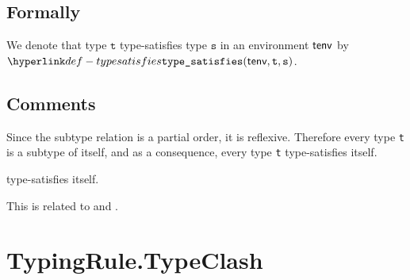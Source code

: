 \documentclass{book}
\newcommand\isanonymous[0]{\texttt{is\_anonymous}}
\newcommand\subtypesat[0]{\texttt{subtype\_satisfies}}
\newcommand\bitwidthequal[0]{\texttt{bitwidth\_equal}}
\newcommand\vt[0]{\texttt{t}}
\newcommand\vs[0]{\texttt{s}}
\begin{document}

\begin{emptyformal}
    \subsection{Formally}
We denote that type $\vt$ type-satisfies type $\vs$ in an environment $\textsf{tenv}$ by \\ $\typesatisfies(\tenv, \vt, \vs)$.
\end{emptyformal}

\subsection{Comments}
  Since the subtype relation is a partial order, it is reflexive. Therefore
  every type \texttt{t} is a subtype of itself, and as a consequence, every type \texttt{t}
  type-satisfies itself.

  type-satisfies itself.

  This is related to  and .


\section{TypingRule.TypeClash\label{sec:TypingRule.TypeClash}}
\end{document}
